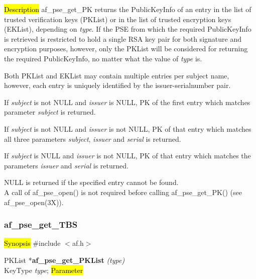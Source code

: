 


\hl{Description}
af\_pse\_get\_PK returns the PublicKeyInfo of an entry in the list of trusted 
verification keys (PKList) or in the list of trusted encryption keys (EKList), depending
on {\em type}.
If the PSE from which the required PublicKeyInfo is retrieved is restricted to hold a single RSA key pair
for both signature and encryption purposes, however, only the PKList will be considered for returning the required PublicKeyInfo,
no matter what the value of {\em type} is.

Both PKList and EKList may contain multiple entries per subject name, however,
each entry is uniquely identified by the issuer-serialnumber pair.

If {\em subject} is not NULL and {\em issuer} is NULL, PK of the first entry which
matches parameter {\em subject} is returned.

If {\em subject} is not NULL and {\em issuer} is not NULL, PK of that entry which 
matches all three parameters {\em subject}, {\em issuer} and {\em serial} is returned.
 
If {\em subject} is NULL and {\em issuer} is not NULL, PK of that entry which matches the
parameters {\em issuer} and {\em serial} is returned.

NULL is returned if the specified entry cannot be found.
\\ [1em]
A call of af\_pse\_open() is not required before calling af\_pse\_get\_PK()
(see af\_pse\_open(3X)).

\subsubsection{af\_pse\_get\_TBS}
\label{af_get_PKList}
\hl{Synopsis}
\#include $<$af.h$>$

PKList *{\bf af\_pse\_get\_PKList} {\em (type)} \\
KeyType {\em type};
\hl{Parameter}

